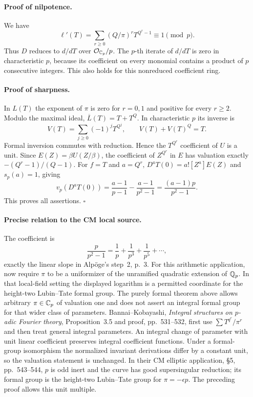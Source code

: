 \paragraph{Proof of nilpotence.}
We have
\[
 \ell'(T)=\sum_{r\geq0}(Q/\pi)^rT^{Q^r-1}\equiv1\pmod p.
\]
Thus $D$ reduces to $d/dT$ over $\mathcal O_{\mathbb C_p}/p$.
The $p$-th iterate of $d/dT$ is zero in characteristic $p$, because
its coefficient on every monomial contains a product of $p$
consecutive integers. This also holds for this nonreduced
coefficient ring.

\paragraph{Proof of sharpness.}
In $L(T)$ the exponent of $\pi$ is zero for $r=0,1$ and positive
for every $r\geq2$. Modulo the maximal ideal,
$\overline L(T)=T+T^Q$. In characteristic $p$ its inverse is
\[
 V(T)=\sum_{j\geq0}(-1)^jT^{Q^j},\qquad V(T)+V(T)^Q=T.
\]
Formal inversion commutes with reduction. Hence the
$T^{Q^r}$ coefficient of $U$ is a unit. Since
$E(Z)=\beta U(Z/\beta)$, the coefficient of $Z^{Q^r}$ in $E$
has valuation exactly $-(Q^r-1)/(Q-1)$. For $f=T$ and $a=Q^r$,
$D^aT(0)=a![Z^a]E(Z)$ and $s_p(a)=1$, giving
\[
 v_p(D^aT(0))=
 \frac{a-1}{p-1}-\frac{a-1}{p^2-1}
 =\frac{(a-1)p}{p^2-1}.
\]
This proves all assertions. $\square$

\paragraph{Precise relation to the CM local source.}
The coefficient is
\[
 \frac{p}{p^2-1}=\frac1p+\frac1{p^3}+\frac1{p^5}+\cdots,
\]
exactly the linear slope in Alp\"oge's step~2, p.~3.
For this arithmetic application, now require $\pi$ to be a
uniformizer of the unramified quadratic extension of $\mathbb Q_p$.
In that local-field setting the displayed logarithm is a permitted
coordinate for the height-two Lubin--Tate formal group.
The purely formal theorem above allows arbitrary $\pi\in\mathbb C_p$
of valuation one and does not assert an integral formal group for
that wider class of parameters.
Bannai--Kobayashi, \emph{Integral structures on $p$-adic Fourier
theory}, Proposition~3.5 and proof, pp.~531--532, first use
$\sum T^{q^r}/\pi^r$ and then treat general integral parameters.
An integral change of parameter with unit linear coefficient
preserves integral coefficient functions. Under a formal-group
isomorphism the normalized invariant derivations differ by a
constant unit, so the valuation statement is unchanged.
In their CM elliptic application, \S5, pp.~543--544, $p$ is odd
inert and the curve has good supersingular reduction; its formal
group is the height-two Lubin--Tate group for
$\pi=-\epsilon p$. The preceding proof allows this unit multiple.

